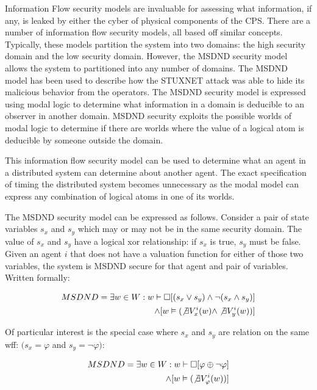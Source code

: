 Information Flow security models are invaluable for assessing what information, if any, is leaked by either the cyber of physical components of the \ac{CPS}. There are a number of information flow security models, all based off similar concepts. Typically, these models partition the system into two domains: the high security domain and the low security domain. However, the MSDND security model allows the system to partitioned into any number of domains. The MSDND model has been used to describe how the STUXNET attack was able to hide its malicious behavior from the operators. The MSDND security model is expressed using modal logic to determine what information in a domain is deducible to an observer in another domain. MSDND security exploits the possible worlds of modal logic to determine if there are worlds where the value of a logical atom is deducible by someone outside the domain.

This information flow security model can be used to determine what an agent in a distributed system can determine about another agent. The exact specification of timing the distributed system becomes unnecessary as the modal model can express any combination of logical atoms in one of its worlds.\cite{Howser2012}\cite{STUXNET}\cite{Howser2013}

The MSDND security model can be expressed as follows\cite{STUXNET}. Consider a pair of state variables $s_x$ and $s_y$ which may or may not be in the same security domain. The value of $s_x$ and $s_y$ have a logical xor relationship: if $s_x$ is true, $s_y$ must be false. Given an agent $i$ that does not have a valuation function for either of those two variables, the system is MSDND secure for that agent and pair of variables. Written formally:

\begin{align}
MSDND = \exists w \in W : w \vdash \Box [ (s_x \vee s_y) \wedge \neg(s_x \wedge s_y) ] 
\nonumber \\ \wedge [ w \vDash ( \not \exists V_x^i (w) \wedge \not \exists V_y^i (w) ) ]
\end{align}

Of particular interest is the special case where $s_x$ and $s_y$ are relation on the same wff: $(s_x = \varphi$ and $s_y = \neg \varphi)$:

\begin{align}
MSDND = \exists w \in W : w \vdash \Box [ \varphi \oplus \neg \varphi ] 
\nonumber \\ \wedge [ w \vDash ( \not \exists V_\varphi^i(w)) ]
\end{align}

